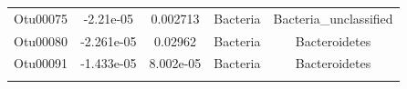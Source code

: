 \documentclass[]{article}
\begin{document}
\begin{longtable}[]{@{}ccccc@{}}
\begin{minipage}[t]{0.13\columnwidth}\centering\strut
Otu00075\strut
\end{minipage} & \begin{minipage}[t]{0.16\columnwidth}\centering\strut
-2.21e-05\strut
\end{minipage} & \begin{minipage}[t]{0.14\columnwidth}\centering\strut
0.002713\strut
\end{minipage} & \begin{minipage}[t]{0.13\columnwidth}\centering\strut
Bacteria\strut
\end{minipage} & \begin{minipage}[t]{0.27\columnwidth}\centering\strut
Bacteria\_unclassified\strut
\end{minipage}\tabularnewline
\begin{minipage}[t]{0.13\columnwidth}\centering\strut
Otu00080\strut
\end{minipage} & \begin{minipage}[t]{0.16\columnwidth}\centering\strut
-2.261e-05\strut
\end{minipage} & \begin{minipage}[t]{0.14\columnwidth}\centering\strut
0.02962\strut
\end{minipage} & \begin{minipage}[t]{0.13\columnwidth}\centering\strut
Bacteria\strut
\end{minipage} & \begin{minipage}[t]{0.27\columnwidth}\centering\strut
Bacteroidetes\strut
\end{minipage}\tabularnewline
\begin{minipage}[t]{0.13\columnwidth}\centering\strut
Otu00091\strut
\end{minipage} & \begin{minipage}[t]{0.16\columnwidth}\centering\strut
-1.433e-05\strut
\end{minipage} & \begin{minipage}[t]{0.14\columnwidth}\centering\strut
8.002e-05\strut
\end{minipage} & \begin{minipage}[t]{0.13\columnwidth}\centering\strut
Bacteria\strut
\end{minipage} & \begin{minipage}[t]{0.27\columnwidth}\centering\strut
Bacteroidetes\strut
\end{minipage}\tabularnewline
\begin{minipage}[t]{0.13\columnwidth}\centering\strut

\end{minipage}
\end{longtable}
\end{document}
